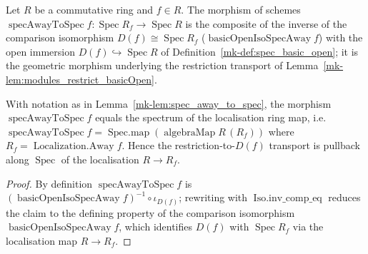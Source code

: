 \begin{lemma}\label{mk-lem:spec_away_to_spec}
  \leanok

  Let \(R\) be a commutative ring and \(f \in R\). The morphism of schemes
  \(\operatorname{specAwayToSpec} f : \operatorname{Spec} R_f \to \operatorname{Spec} R\) is the
  composite of the inverse of the comparison isomorphism \(D(f) \cong \operatorname{Spec} R_f\)
  (\(\operatorname{basicOpenIsoSpecAway} f\)) with the open immersion
  \(D(f) \hookrightarrow \operatorname{Spec} R\) of Definition~\ref{mk-def:spec_basic_open}; it is the
  geometric morphism underlying the restriction transport of
  Lemma~\ref{mk-lem:modules_restrict_basicOpen}.
\end{lemma}

\begin{lemma}\label{mk-lem:spec_away_to_spec_eq}
  \leanok

  With notation as in Lemma~\ref{mk-lem:spec_away_to_spec}, the morphism
  \(\operatorname{specAwayToSpec} f\) equals the spectrum of the localisation ring map, i.e.\
  \(\operatorname{specAwayToSpec} f = \operatorname{Spec.map}(\operatorname{algebraMap} R\,(R_f))\)
  where \(R_f = \operatorname{Localization.Away} f\). Hence the restriction-to-\(D(f)\) transport is
  pullback along \(\operatorname{Spec}\) of the localisation \(R \to R_f\).
\end{lemma}
\begin{proof}
  \leanok
  By definition \(\operatorname{specAwayToSpec} f\) is
  \((\operatorname{basicOpenIsoSpecAway} f)^{-1} \circ \iota_{D(f)}\); rewriting with
  \(\operatorname{Iso.inv\_comp\_eq}\) reduces the claim to the defining property of the comparison
  isomorphism \(\operatorname{basicOpenIsoSpecAway} f\), which identifies \(D(f)\) with
  \(\operatorname{Spec} R_f\) via the localisation map \(R \to R_f\).
\end{proof}

